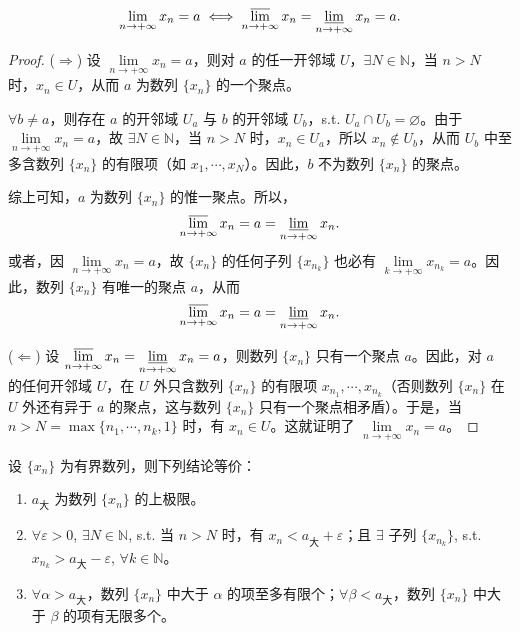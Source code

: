 \begin{theorem}\label{thm:1.5.2}
\[
\lim_{n\to+\infty} x_n = a \iff \varlimsup_{n\to+\infty} x_n = \varliminf_{n\to+\infty} x_n = a.
\]
\end{theorem}

\begin{proof}
($\Rightarrow$) 设 $\lim\limits_{n\to+\infty} x_n = a$，则对 $a$ 的任一开邻域 $U$，$\exists N \in \mathbb{N}$，当 $n > N$ 时，$x_n \in U$，从而 $a$ 为数列 $\{x_n\}$ 的一个聚点。

$\forall b \neq a$，则存在 $a$ 的开邻域 $U_a$ 与 $b$ 的开邻域 $U_b$，s.t. $U_a \cap U_b = \varnothing$。由于 $\lim\limits_{n\to+\infty} x_n = a$，故 $\exists N \in \mathbb{N}$，当 $n > N$ 时，$x_n \in U_a$，所以 $x_n \notin U_b$，从而 $U_b$ 中至多含数列 $\{x_n\}$ 的有限项（如 $x_1, \cdots, x_N$）。因此，$b$ 不为数列 $\{x_n\}$ 的聚点。

综上可知，$a$ 为数列 $\{x_n\}$ 的惟一聚点。所以，
\[
\varlimsup_{n\to+\infty} x_n = a = \varliminf_{n\to+\infty} x_n.
\]
或者，因 $\lim\limits_{n\to+\infty} x_n = a$，故 $\{x_n\}$ 的任何子列 $\{x_{n_k}\}$ 也必有 $\lim\limits_{k\to+\infty} x_{n_k} = a$。因此，数列 $\{x_n\}$ 有唯一的聚点 $a$，从而
\[
\varlimsup_{n\to+\infty} x_n = a = \varliminf_{n\to+\infty} x_n.
\]

($\Leftarrow$) 设 $\varlimsup\limits_{n\to+\infty} x_n = \varliminf\limits_{n\to+\infty} x_n = a$，则数列 $\{x_n\}$ 只有一个聚点 $a$。因此，对 $a$ 的任何开邻域 $U$，在 $U$ 外只含数列 $\{x_n\}$ 的有限项 $x_{n_1}, \cdots, x_{n_k}$（否则数列 $\{x_n\}$ 在 $U$ 外还有异于 $a$ 的聚点，这与数列 $\{x_n\}$ 只有一个聚点相矛盾）。于是，当 $n > N = \max\{n_1, \cdots, n_k, 1\}$ 时，有 $x_n \in U$。这就证明了 $\lim\limits_{n\to+\infty} x_n = a$。
\end{proof}

\begin{theorem}\label{thm:1.5.3}
设 $\{x_n\}$ 为有界数列，则下列结论等价：
\begin{enumerate}
    \item $a_{\text{大}}$ 为数列 $\{x_n\}$ 的上极限。
    \item $\forall \varepsilon > 0$, $\exists N \in \mathbb{N}$, s.t. 当 $n > N$ 时，有 $x_n < a_{\text{大}} + \varepsilon$；且 $\exists$ 子列 $\{x_{n_k}\}$, s.t. $x_{n_k} > a_{\text{大}} - \varepsilon$, $\forall k \in \mathbb{N}$。
    \item $\forall \alpha > a_{\text{大}}$，数列 $\{x_n\}$ 中大于 $\alpha$ 的项至多有限个；$\forall \beta < a_{\text{大}}$，数列 $\{x_n\}$ 中大于 $\beta$ 的项有无限多个。
\end{enumerate}
\end{theorem}

